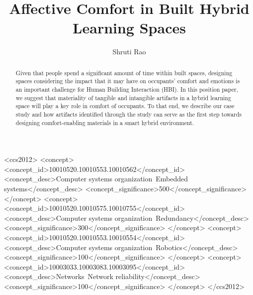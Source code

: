 \documentclass[acmconf, anonymous, review]{acmart}
\begin{document}
\title{Affective Comfort in Built Hybrid Learning Spaces}

\author{Shruti Rao}



\renewcommand{\shortauthors}{Rao et al.}

\begin{abstract}
Given that people spend a significant amount of time within built spaces, designing spaces considering the impact that it may have on occupants’ comfort and emotions is an important challenge for Human Building Interaction (HBI). In this position paper, we suggest that materiality of tangible and intangible artifacts in a hybrid learning space will play a key role in comfort of occupants. To that end, we describe our case study and how artifacts identified through the study can serve as the first step towards designing comfort-enabling materials in a smart hybrid environment. 
\end{abstract}


\begin{CCSXML}
<ccs2012>
 <concept>
  <concept_id>10010520.10010553.10010562</concept_id>
  <concept_desc>Computer systems organization~Embedded systems</concept_desc>
  <concept_significance>500</concept_significance>
 </concept>
 <concept>
  <concept_id>10010520.10010575.10010755</concept_id>
  <concept_desc>Computer systems organization~Redundancy</concept_desc>
  <concept_significance>300</concept_significance>
 </concept>
 <concept>
  <concept_id>10010520.10010553.10010554</concept_id>
  <concept_desc>Computer systems organization~Robotics</concept_desc>
  <concept_significance>100</concept_significance>
 </concept>
 <concept>
  <concept_id>10003033.10003083.10003095</concept_id>
  <concept_desc>Networks~Network reliability</concept_desc>
  <concept_significance>100</concept_significance>
 </concept>
</ccs2012>
\end{CCSXML}
\end{document}
